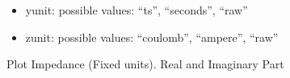 \documentclass[letterpaper,10pt,openany,oneside,english]{sphinxmanual}
\begin{document}
\begin{fulllineitems}
\begin{fulllineitems}
\begin{description}
\begin{itemize}
\item {} 
yunit: possible values: “ts”, “seconds”, “raw”

\item {} 
zunit: possible values: “coulomb”, “ampere”, “raw”

\end{itemize}

\end{description}

\end{fulllineitems}


\begin{fulllineitems}
\label{\detokenize{plots:plots.SimplePlotter.impedance}}
Plot Impedance (Fixed units). Real and Imaginary Part

\end{fulllineitems}


\end{fulllineitems}

\end{document}
